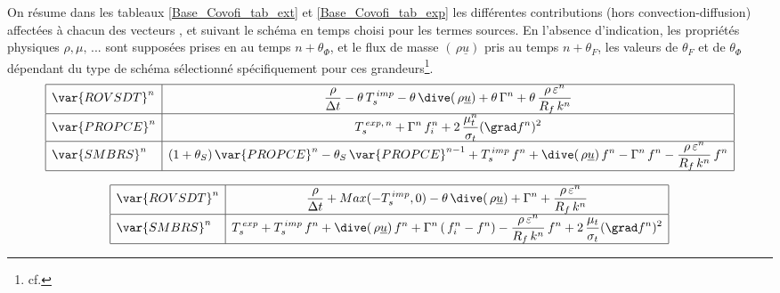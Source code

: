 On r\'{e}sume dans les tableaux \ref{Base_Covofi_tab_ext} et \ref{Base_Covofi_tab_exp} les diff\'{e}rentes
contributions (hors convection-diffusion) affect\'{e}es \`{a} chacun des vecteurs
,  et  suivant le sch\'{e}ma en temps choisi pour
les termes sources. En l'absence d'indication, les propri\'{e}t\'{e}s physiques
$\rho,\mu,\,...$ sont suppos\'{e}es prises en  au temps $n+\theta_\Phi$, et le flux
de masse $(\,\rho \underline{u})$ pris au temps $n+\theta_F$, les valeurs de
$\theta_F$ et de $\theta_\Phi$ d\'{e}pendant du type de sch\'{e}ma s\'{e}lectionn\'{e}
sp\'{e}cifiquement pour ces grandeurs\footnote{cf. }.
\\

\begin{equation}\label{Base_Covofi_tab_ext}
\begin{array}{|l|c|}
\hline
\var{ROVSDT}^{n} &
\displaystyle
\frac{\rho}{\Delta t}-\theta\,T_s^{\,imp}- \theta\,\dive(\,\rho \underline{u}) +
\theta\,\Gamma^{n}+\theta\,\frac{\rho\,\varepsilon^{n}}{R_f\,k^{n}} \\
\hline
\var{PROPCE}^{n} &
\displaystyle
T_s^{\,exp,\,n} + \Gamma^{n}\,f_i^{n} + 2\, \frac{\mu_t^{n}}{\sigma_t}(\grad f^{n})^2\\
\hline
\var{SMBRS}^{n} &
\displaystyle
(1+\theta_S)\,\var{PROPCE}^{n}-\theta_S\,\var{PROPCE}^{n-1}+ T_s^{\,imp}\,f^{n}
+\dive(\,\rho \underline{u})\,f^{n}-\Gamma^{n}\,f^{n} -
\frac{\rho\,\varepsilon^{n}}{R_f\,k^{n}}\,f^{n}\\
\hline
\end{array}
\end{equation}

\begin{equation}\label{Base_Covofi_tab_exp}
\begin{array} {|l|c|}
\hline
\var{ROVSDT}^{n} &
\displaystyle
\frac{\rho}{\Delta t} + Max(-T_s^{\,imp},0) - \theta\,\dive(\,\rho
\underline{u}) + \Gamma^{n} + \frac{\rho\,\varepsilon^{n}}{R_f\,k^{n}} \\
\hline
\var{SMBRS}^{n} &
\displaystyle
T_s^{\,exp} + T_s^{\,imp}\,f^{n}+\dive(\,\rho
\underline{u})\,f^{n}+\Gamma^{n}\,(\,f_i^{n}-f^{n}) -
\frac{\rho\,\varepsilon^{n}}{R_f\,k^{n}}\,f^{n} + 2\,
\frac{\mu_t}{\sigma_t}(\grad f^{n})^2 \\
\hline
\end{array}
\end{equation}

